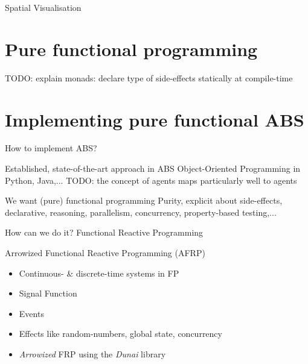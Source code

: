 \documentclass{beamer}
\begin{document}
\begin{frame}{Spatial Visualisation}
\end{frame}

\section{Pure functional programming}
TODO: explain monads: declare type of side-effects statically at compile-time

\section{Implementing pure functional ABS}
\begin{frame}{How to implement ABS?}
  \begin{block}{Established, state-of-the-art approach in ABS}
	Object-Oriented Programming in Python, Java,...
	TODO: the concept of agents maps particularly well to agents
  \end{block}
  
  \begin{block}{We want (pure) functional programming}
	Purity, explicit about side-effects, declarative, reasoning, parallelism, concurrency, property-based testing,...
  \end{block}
  
  \begin{block}{How can we do it?}
  	Functional Reactive Programming
  \end{block}
\end{frame}

\begin{frame}{Arrowized Functional Reactive Programming (AFRP)}
  \begin{itemize}
    \item Continuous- \& discrete-time systems in FP
 	\item Signal Function 
 	\item Events
 	\item Effects like random-numbers, global state, concurrency
 	\item \textit{Arrowized} FRP using the \textit{Dunai} library
  \end{itemize}
\end{frame}
\end{document}
